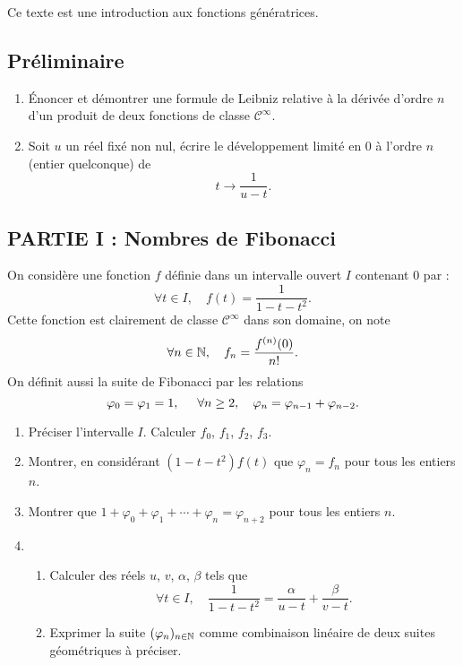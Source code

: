 Ce texte est une introduction aux fonctions g{\'e}n{\'e}ratrices.
\subsection*{Pr{\'e}liminaire}

\begin{enumerate}
\item  \'Enoncer et d{\'e}montrer une formule de Leibniz relative {\`a} la
d{\'e}riv{\'e}e d'ordre $n$ d'un produit de deux fonctions de classe $\mathcal{C}^{\infty }$.

\item  Soit $u$ un r{\'e}el fix{\'e} non nul, {\'e}crire le
d{\'e}veloppement limit{\'e} en 0 {\`a} l'ordre $n$ (entier quelconque) de
\[
t\rightarrow \frac{1}{u-t}.
\]
\end{enumerate}

\subsection*{PARTIE I : Nombres de Fibonacci}

On consid{\`e}re une fonction $f$ d{\'e}finie dans un intervalle ouvert $I$
contenant 0 par :
\[
\forall t\in I,\quad f(t)=\frac{1}{1-t-t^{2}}.
\]
Cette fonction est clairement de classe $\mathcal{C}^{\infty }$ dans son
domaine, on note
\[
\forall n\in \mathbb{N},\quad f_{n}=\frac{f^{(n)}(0)}{n!}.
\]
On d{\'e}finit aussi la suite de Fibonacci par les relations
\[
\varphi _{0} = \varphi _{1} = 1, \hspace{0.5cm} \forall n \geq 2,\quad \varphi _{n} = \varphi _{n-1} + \varphi _{n-2}.
\]

\begin{enumerate}
\item  Pr{\'e}ciser l'intervalle $I$. Calculer $f_{0}$, $f_{1}$, $f_{2}$, $f_{3}.$

\item  Montrer, en consid{\'e}rant $(1-t-t^{2})f(t)$ que $\varphi _{n}=f_{n}$ pour tous les entiers $n$.

\item  Montrer que $1+\varphi _{0}+\varphi _{1}+\cdots +\varphi _{n}=\varphi_{n+2}$ pour tous les entiers $n$.

\item
\begin{enumerate}
\item  Calculer des r{\'e}els $u$, $v$, $\alpha $, $\beta $ tels que
\[
\forall t\in I\mathbf{,\quad }\frac{1}{1-t-t^{2}}=\frac{\alpha }{u-t}+\frac{\beta }{v-t}.
\]

\item  Exprimer la suite $(\varphi _{n})_{n\in \mathbb{N}}$ comme combinaison lin{\'e}aire de deux suites g{\'e}om{\'e}triques {\`a} pr{\'e}ciser.
\end{enumerate}
\end{enumerate}

